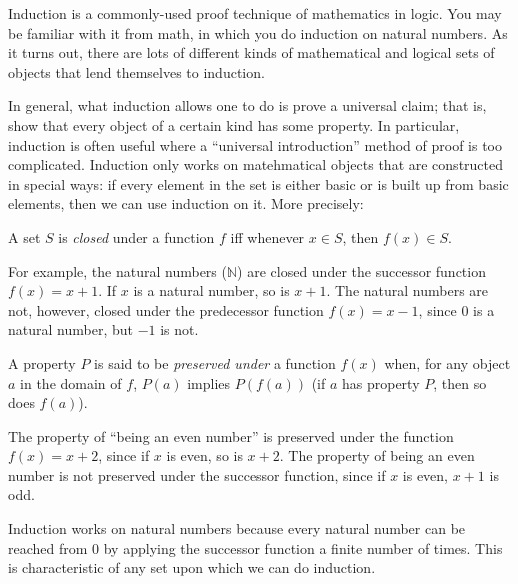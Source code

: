 \documentclass[../../include/open-logic-section]{subfiles}
\begin{document}


\begin{explain}
Induction is a commonly-used proof technique of mathematics in logic. 
You may be familiar with it from math, in which you do induction on 
natural numbers. As it turns out, there are lots of different kinds of 
mathematical and logical sets of objects that lend themselves to induction.

In general, what induction allows one to do is prove a universal claim; that 
is, show that every object of a certain kind has some property. In particular, 
induction is often useful where a ``universal introduction'' method of proof 
is too complicated. Induction only works on matehmatical objects that are 
constructed in special ways: if every element in the set is either basic or is 
built up from basic elements, then we can use induction on it. More precisely:
\end{explain}

\begin{defn}
A set $S$ is \emph{closed} under a function $f$ iff whenever $x \in
S$, then $f(x) \in S$.
\end{defn}

\begin{explain}
For example, the natural numbers ($\mathbb{N}$) are closed under the
successor function $f(x) = x+1$. If $x$ is a natural number, so is
$x+1$. The natural numbers are not, however, closed under the
predecessor function $f(x) = x-1$, since $0$ is a natural number, but
$-1$ is not.
\end{explain}

\begin{defn}
A property $P$ is said to be \emph{preserved under} a function $f(x)$
when, for any object $a$ in the domain of $f$, $P(a)$ implies
$P(f(a))$ (if $a$ has property $P$, then so does $f(a)$).
\end{defn}

\begin{explain}
The property of ``being an even number'' is preserved under the
function $f(x) = x+2$, since if $x$ is even, so is $x+2$. The property
of being an even number is not preserved under the successor function,
since if $x$ is even, $x+1$ is odd.

Induction works on natural numbers because every natural number can be
reached from 0 by applying the successor function a finite number of
times. This is characteristic of any set upon which we can do
induction.
\end{explain}
\end{document}
